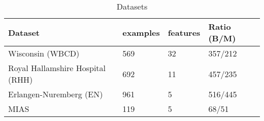 \medskip
\begin{table}[ht!]
\begin{adjustwidth}{-5.in}{-5.in}
\begin{center}
   \begin{tabular}{l*{3}{l}}
   \hline
   Dataset         &
   examples  &
   features  &
   Ratio (B/M)     \\
   \hline
   Wisconsin (WBCD)						 &
   569                         &
   32                          &
   357/212                     \\
   Royal Hallamshire Hospital (RHH)  &
   692                         &
   11                          &
   457/235                     \\
   Erlangen-Nuremberg (EN)     &
   961                         &
   5                           &
   516/445                     \\
   MIAS         							 &
   119                         &
   5                           &
   68/51                     	 \\
  \hline
  \end{tabular}
  \caption{Datasets}
  \label{table:datasets_info}
\end{center}
\end{adjustwidth}
\end{table}
